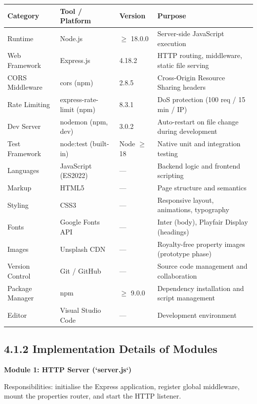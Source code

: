 \documentclass[12pt,a4paper]{report}
\begin{document}
\begin{center}
\begin{tabular}{|l|l|l|l|}
\hline
Category & Tool / Platform & Version & Purpose \\
\hline
Runtime & Node.js & $\geq$ 18.0.0 & Server-side JavaScript execution \\
\hline
Web Framework & Express.js & 4.18.2 & HTTP routing, middleware, static file serving \\
\hline
CORS Middleware & cors (npm) & 2.8.5 & Cross-Origin Resource Sharing headers \\
\hline
Rate Limiting & express-rate-limit (npm) & 8.3.1 & DoS protection (100 req / 15 min / IP) \\
\hline
Dev Server & nodemon (npm, dev) & 3.0.2 & Auto-restart on file change during development \\
\hline
Test Framework & node:test (built-in) & Node $\geq$ 18 & Native unit and integration testing \\
\hline
Languages & JavaScript (ES2022) & --- & Backend logic and frontend scripting \\
\hline
Markup & HTML5 & --- & Page structure and semantics \\
\hline
Styling & CSS3 & --- & Responsive layout, animations, typography \\
\hline
Fonts & Google Fonts API & --- & Inter (body), Playfair Display (headings) \\
\hline
Images & Unsplash CDN & --- & Royalty-free property images (prototype phase) \\
\hline
Version Control & Git / GitHub & --- & Source code management and collaboration \\
\hline
Package Manager & npm & $\geq$ 9.0.0 & Dependency installation and script management \\
\hline
Editor & Visual Studio Code & --- & Development environment \\
\hline
\end{tabular}
\end{center}

\subsection{4.1.2 Implementation Details of Modules}
\textbf{Module 1: HTTP Server (`server.js`)}

Responsibilities: initialise the Express application, register global middleware, mount the properties router, and start the HTTP listener.
\end{document}
